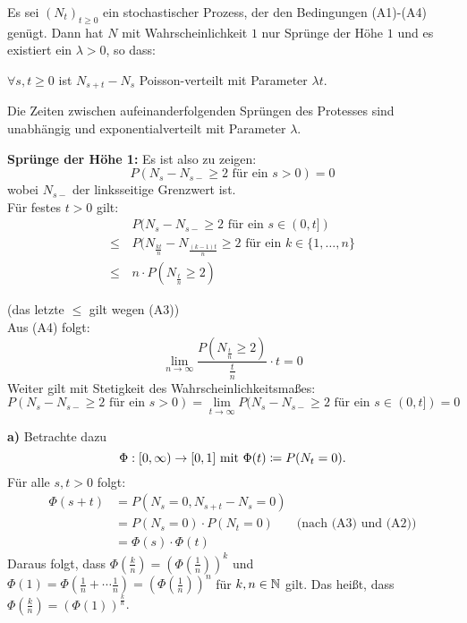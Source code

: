\documentclass[a4paper,twoside,DIV15,BCOR12mm]{scrbook}
\begin{document}
\begin{satz}
  \label{satz:7.1}
  Es sei $(N_t)_{t\geq 0}$ ein stochastischer Prozess, der den Bedingungen (A1)-(A4) genügt.
  Dann hat $N$ mit Wahrscheinlichkeit $1$ nur Sprünge der Höhe $1$ und es existiert ein
  $\lambda>0$, so dass:
  \begin{enuma}
  \item $\forall s,t\geq 0$ ist $N_{s+t}-N_s$ Poisson-verteilt mit Parameter $\lambda t$.
  \item Die Zeiten zwischen aufeinanderfolgenden Sprüngen des Protesses sind unabhängig und exponentialverteilt mit Parameter $\lambda$.
  \end{enuma}
\end{satz}


\begin{beweis} 
\textbf{Sprünge der Höhe 1:} Es ist also zu zeigen:
  \[
  P(N_s-N_{s-}\geq 2 \text{ für ein } s>0)=0
  \]
  wobei $N_{s-}$ der linksseitige Grenzwert ist. \\
  Für festes $t>0$ gilt:
  \begin{align*}
   & P(N_s-N_{s-}\geq 2 \text{ für ein } s\in (0,t]) \\
\leq \, & P(N_{\frac{kt}{n}}-N_{\frac{(k-1)t}{n}}\geq 2 \text{ für ein } k\in\{1,\dots,n\} \\    
\leq \, & n\cdot P(N_{\frac{t}{n}}\geq 2)
  \end{align*}

(das letzte $\leq$ gilt wegen (A3)) \\
Aus (A4) folgt:
\[
\lim_{n\rightarrow\infty} \frac{P(N_{\frac{t}{n}}\geq 2)}{\frac{t}{n}}\cdot t=0
\]
Weiter gilt mit Stetigkeit des Wahrscheinlichkeitsmaßes:
\[
P(N_s-N_{s-}\geq 2 \text{ für ein } s>0)=
\lim_{t\rightarrow\infty}P(N_s-N_{s-}\geq 2 \text{ für ein } s\in (0,t])=0
\]

\textbf{a)} Betrachte dazu
\[
\Phi:[0,\infty) \to [0,1] \text{ mit }\Phi(t) \da P(N_t =0).
\]
Für alle $s,t>0$ folgt:
\begin{align*}
\Phi(s+t)
&= P(N_s = 0,N_{s+t} - N_s = 0) \\
 &= P(N_s=0) \cdot P(N_t=0) &\text{(nach (A3) und (A2))}\\
&= \Phi(s) \cdot \Phi(t)
\end{align*}
Daraus folgt, dass $\Phi(\frac kn) = (\Phi(\frac 1n))^k$ und $\Phi(1) = \Phi(\frac 1n + \cdots \frac 1n) = (\Phi(\frac 1n))^n$ für $k,n\in \mathbb{N}$ gilt. Das heißt, dass $\Phi(\frac kn) = (\Phi(1))^{\frac kn}$.


\end{beweis}
\end{document}
